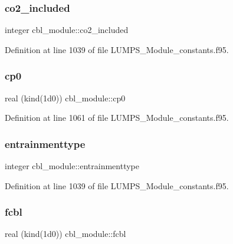 \subsubsection{\texorpdfstring{co2\+\_\+included}{co2\_included}}
{\footnotesize\ttfamily integer cbl\+\_\+module\+::co2\+\_\+included}



Definition at line 1039 of file L\+U\+M\+P\+S\+\_\+\+Module\+\_\+constants.\+f95.

\mbox{\label{namespacecbl__module_a01651700bba3680529190559891e308f}} 
\subsubsection{\texorpdfstring{cp0}{cp0}}
{\footnotesize\ttfamily real (kind(1d0)) cbl\+\_\+module\+::cp0}



Definition at line 1061 of file L\+U\+M\+P\+S\+\_\+\+Module\+\_\+constants.\+f95.

\mbox{\label{namespacecbl__module_a904519e3dcaa1592e2506c840b8cc7e4}} 
\subsubsection{\texorpdfstring{entrainmenttype}{entrainmenttype}}
{\footnotesize\ttfamily integer cbl\+\_\+module\+::entrainmenttype}



Definition at line 1039 of file L\+U\+M\+P\+S\+\_\+\+Module\+\_\+constants.\+f95.

\mbox{\label{namespacecbl__module_abece0fd4503899af7cb75b51be8b5e63}} 
\subsubsection{\texorpdfstring{fcbl}{fcbl}}
{\footnotesize\ttfamily real (kind(1d0)) cbl\+\_\+module\+::fcbl}



